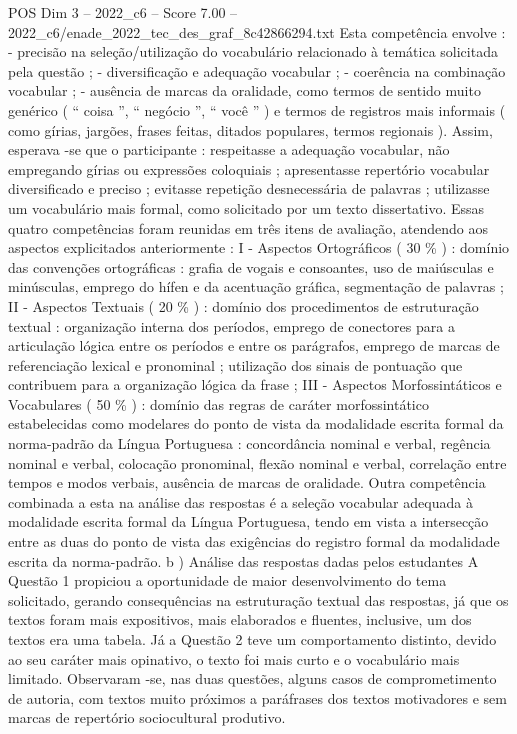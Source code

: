 \begin{textsample}{POS Dim 3 – 2022\_c6 – Score 7.00 – 2022\_c6/enade\_2022\_tec\_des\_graf\_8c42866294.txt}
Esta competência envolve : - precisão na seleção/utilização do vocabulário relacionado à temática solicitada pela questão ; - diversificação e adequação vocabular ; - coerência na combinação vocabular ; - ausência de marcas da oralidade, como termos de sentido muito genérico ( “ coisa ”, “ negócio ”, “ você ” ) e termos de registros mais informais ( como gírias, jargões, frases feitas, ditados populares, termos regionais ).
Assim, esperava -se que o participante : respeitasse a adequação vocabular, não empregando gírias ou expressões coloquiais ; apresentasse repertório vocabular diversificado e preciso ; evitasse repetição desnecessária de palavras ; utilizasse um vocabulário mais formal, como solicitado por um texto dissertativo.
Essas quatro competências foram reunidas em três itens de avaliação, atendendo aos aspectos explicitados anteriormente : I - Aspectos Ortográficos ( 30 \% ) : domínio das convenções ortográficas : grafia de vogais e consoantes, uso de maiúsculas e minúsculas, emprego do hífen e da acentuação gráfica, segmentação de palavras ; II - Aspectos Textuais ( 20 \% ) : domínio dos procedimentos de estruturação textual : organização interna dos períodos, emprego de conectores para a articulação lógica entre os períodos e entre os parágrafos, emprego de marcas de referenciação lexical e pronominal ; utilização dos sinais de pontuação que contribuem para a organização lógica da frase ; III - Aspectos Morfossintáticos e Vocabulares ( 50 \% ) : domínio das regras de caráter morfossintático estabelecidas como modelares do ponto de vista da modalidade escrita formal da norma-padrão da Língua Portuguesa : concordância nominal e verbal, regência nominal e verbal, colocação pronominal, flexão nominal e verbal, correlação entre tempos e modos verbais, ausência de marcas de oralidade.
Outra competência combinada a esta na análise das respostas é a seleção vocabular adequada à modalidade escrita formal da Língua Portuguesa, tendo em vista a intersecção entre as duas do ponto de vista das exigências do registro formal da modalidade escrita da norma-padrão. b ) Análise das respostas dadas pelos estudantes A Questão 1 propiciou a oportunidade de maior desenvolvimento do tema solicitado, gerando consequências na estruturação textual das respostas, já que os textos foram mais expositivos, mais elaborados e fluentes, inclusive, um dos textos era uma tabela.
Já a Questão 2 teve um comportamento distinto, devido ao seu caráter mais opinativo, o texto foi mais curto e o vocabulário mais limitado.
Observaram -se, nas duas questões, alguns casos de comprometimento de autoria, com textos muito próximos a paráfrases dos textos motivadores e sem marcas de repertório sociocultural produtivo.

\end{textsample}
